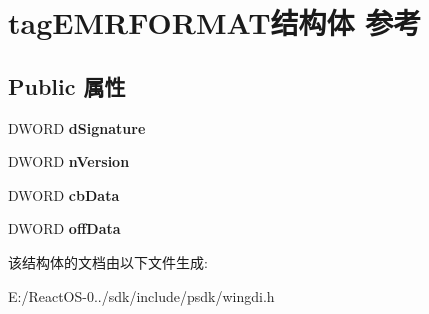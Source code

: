 \hypertarget{structtag_e_m_r_f_o_r_m_a_t}{}\section{tag\+E\+M\+R\+F\+O\+R\+M\+A\+T结构体 参考}
\label{structtag_e_m_r_f_o_r_m_a_t}
\subsection*{Public 属性}
\begin{DoxyCompactItemize}
\item 
\mbox{\label{structtag_e_m_r_f_o_r_m_a_t_ae25a92897954eb8038a96195e82fea7c}} 
D\+W\+O\+RD {\bfseries d\+Signature}
\item 
\mbox{\label{structtag_e_m_r_f_o_r_m_a_t_a79321c0d6d74c87ccd52979b10aed3a2}} 
D\+W\+O\+RD {\bfseries n\+Version}
\item 
\mbox{\label{structtag_e_m_r_f_o_r_m_a_t_a1dd4d11c8db221c05dffc75a6e04b669}} 
D\+W\+O\+RD {\bfseries cb\+Data}
\item 
\mbox{\label{structtag_e_m_r_f_o_r_m_a_t_a09fb338ed645c31a99f21875b48ae2c0}} 
D\+W\+O\+RD {\bfseries off\+Data}
\end{DoxyCompactItemize}


该结构体的文档由以下文件生成\+:\begin{DoxyCompactItemize}
\item 
E\+:/\+React\+O\+S-\/0../sdk/include/psdk/wingdi.\+h\end{DoxyCompactItemize}
